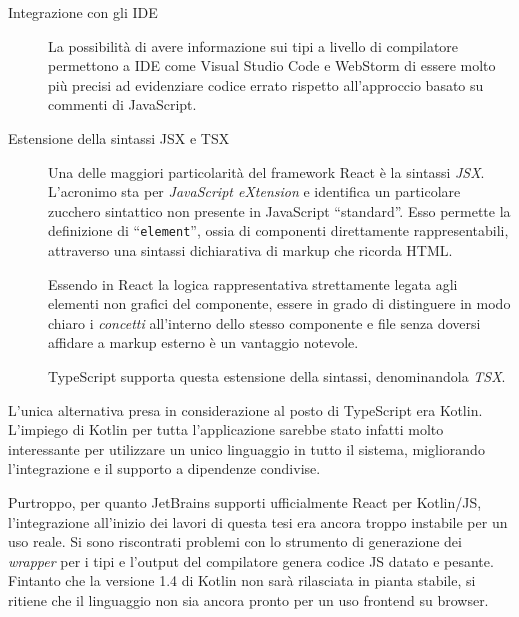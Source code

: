 \begin{description}
          \item[Integrazione con gli IDE]
            La possibilità di avere informazione sui tipi a livello di compilatore permettono a IDE come Visual Studio Code e WebStorm di essere molto più precisi ad evidenziare codice errato rispetto all'approccio basato su commenti di JavaScript.

          \item[Estensione della sintassi JSX e TSX]
            Una delle maggiori particolarità del framework React è la sintassi \emph{JSX}\@.
            L'acronimo sta per \emph{\emph{J}ava\emph{S}cript e\emph{X}tension} e identifica un particolare zucchero sintattico non presente in JavaScript ``standard''.
            Esso permette la definizione di ``\texttt{element}'', ossia di componenti direttamente rappresentabili, attraverso una sintassi dichiarativa di markup che ricorda HTML\@. 

            Essendo in React la logica rappresentativa strettamente legata agli elementi non grafici del componente, essere in grado di distinguere in modo chiaro i \emph{concetti}
            all'interno dello stesso componente e file senza doversi affidare a markup esterno è un vantaggio notevole.

            TypeScript supporta questa estensione della sintassi, denominandola \emph{TSX}.

        \end{description}

        L'unica alternativa presa in considerazione al posto di TypeScript era Kotlin.
        L'impiego di Kotlin per tutta l'applicazione sarebbe stato infatti molto interessante per utilizzare un unico linguaggio in tutto il sistema, migliorando l'integrazione e il supporto a dipendenze condivise.

        Purtroppo, per quanto JetBrains supporti ufficialmente React per Kotlin/JS, l'integrazione all'inizio dei lavori di questa tesi era ancora troppo instabile per un uso reale.
        Si sono riscontrati problemi con lo strumento di generazione dei \emph{wrapper} per i tipi e l'output del compilatore genera codice JS datato e pesante.
        Fintanto che la versione 1.4 di Kotlin non sarà rilasciata in pianta stabile, si ritiene che il linguaggio non sia ancora pronto per un uso frontend su browser.

